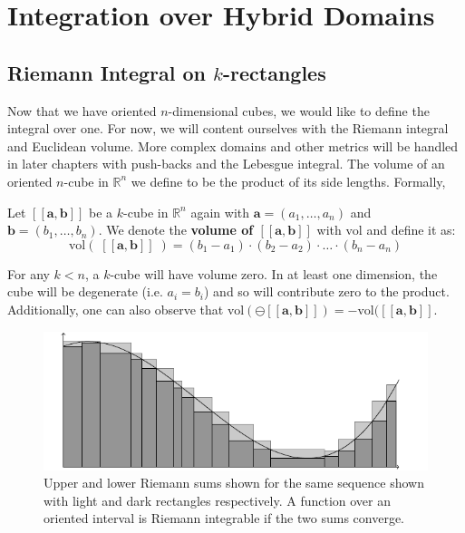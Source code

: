 \section{Integration over Hybrid Domains}


\subsection{Riemann Integral on $k$-rectangles}


Now that we have oriented $n$-dimensional cubes, we would like to define the integral over one.
For now, we will content ourselves with the Riemann integral and Euclidean volume.
More complex domains and other metrics will be handled in later chapters with push-backs and the Lebesgue integral.
The volume of an oriented $n$-cube in $\mathbb{R}^n$ we define to be the product of its side lengths.
Formally,

\begin{definition}
	Let $[\![\boldsymbol{a}, \boldsymbol{b}]\!]$ be a $k$-cube in $\mathbb{R}^n$ again with $\boldsymbol{a}=(a_1,\ldots, a_n)$ and $\boldsymbol{b}=(b_1,\ldots, b_n)$. 
	We denote the \textbf{volume of $\boldsymbol{[\![a,b]\!]}$} with $\text{vol}$ and define it as:
	\begin{equation}
		\text{vol}(\; [\![\boldsymbol{a}, \boldsymbol{b} ]\!] \;) = (b_1 - a_1) \cdot (b_2 - a_2) \cdot \ldots \cdot (b_n - a_n)
	\end{equation}
\end{definition}

For any $k<n$, a $k$-cube will have volume zero.
In at least one dimension, the cube will be degenerate (i.e. $a_i = b_i$) and so will contribute zero to the product.
Additionally, one can also observe that $\text{vol}( \ominus [\![\boldsymbol{a}, \boldsymbol{b} ]\!]) = - \text{vol}( [\![ \boldsymbol{a}, \boldsymbol{b} ]\!]$.


\begin{figure}[ht]
\caption[Riemann Integral]{Upper and lower Riemann sums shown for the same sequence shown with light and dark rectangles respectively. A function over an oriented interval is Riemann integrable if the two sums converge.}
\centering
\includegraphics[scale=0.6]{diagrams/riemann}
\end{figure}

